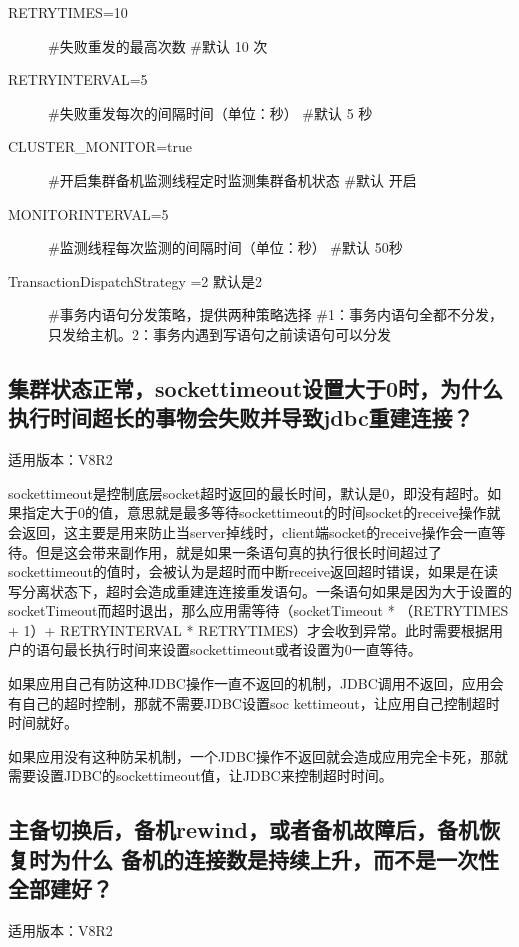 \documentclass[a4,10pt,oneside,english]{sphinxmanual}
\begin{document}
\begin{description}
\item[{RETRYTIMES=10}] \leavevmode
\#失败重发的最高次数
\#默认 10 次

\item[{RETRYINTERVAL=5}] \leavevmode
\#失败重发每次的间隔时间（单位：秒）
\#默认 5 秒

\item[{CLUSTER\_MONITOR=true}] \leavevmode
\#开启集群备机监测线程定时监测集群备机状态
\#默认 开启

\item[{MONITORINTERVAL=5}] \leavevmode
\#监测线程每次监测的间隔时间（单位：秒）
\#默认 50秒

\item[{TransactionDispatchStrategy =2  默认是2}] \leavevmode
\#事务内语句分发策略，提供两种策略选择
\#1：事务内语句全都不分发，只发给主机。2：事务内遇到写语句之前读语句可以分发

\end{description}


\subsection{集群状态正常，sockettimeout设置大于0时，为什么执行时间超长的事物会失败并导致jdbc重建连接？}
\label{\detokenize{interface/jdbc:sockettimeout0-jdbc}}
适用版本：V8R2

sockettimeout是控制底层socket超时返回的最长时间，默认是0，即没有超时。如果指定大于0的值，意思就是最多等待sockettimeout的时间socket的receive操作就会返回，这主要是用来防止当server掉线时，client端socket的receive操作会一直等待。但是这会带来副作用，就是如果一条语句真的执行很长时间超过了sockettimeout的值时，会被认为是超时而中断receive返回超时错误，如果是在读写分离状态下，超时会造成重建连连接重发语句。一条语句如果是因为大于设置的socketTimeout而超时退出，那么应用需等待（socketTimeout * （RETRYTIMES + 1）+ RETRYINTERVAL * RETRYTIMES）才会收到异常。此时需要根据用户的语句最长执行时间来设置sockettimeout或者设置为0一直等待。

如果应用自己有防这种JDBC操作一直不返回的机制，JDBC调用不返回，应用会有自己的超时控制，那就不需要JDBC设置soc kettimeout，让应用自己控制超时时间就好。

如果应用没有这种防呆机制，一个JDBC操作不返回就会造成应用完全卡死，那就需要设置JDBC的sockettimeout值，让JDBC来控制超时时间。


\subsection{主备切换后，备机rewind，或者备机故障后，备机恢复时为什么 备机的连接数是持续上升，而不是一次性全部建好？}
\label{\detokenize{interface/jdbc:rewind}}
适用版本：V8R2
\end{document}
